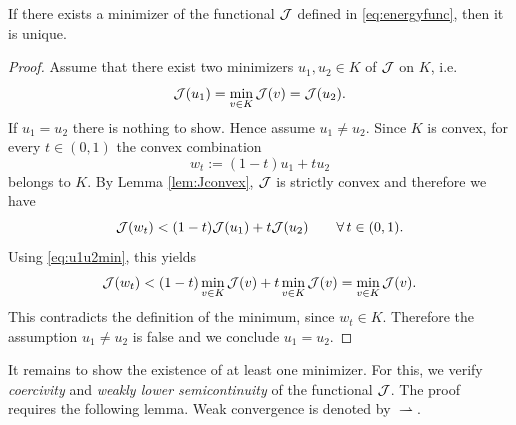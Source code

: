 \begin{proposition}\label{pr:Junique}
	If there exists a minimizer of the functional ${\mathcal J}$ defined in \eqref{eq:energyfunc}, then it is unique.
\end{proposition}
\begin{proof}
	Assume that there exist two minimizers $u_1,u_2\in K$ of ${\mathcal J}$ on $K$, i.e.
	\begin{equation}\label{eq:u1u2min}
		{\mathcal J}(u_1)=\min_{v\in K}{\mathcal J}(v)={\mathcal J}(u_2).
	\end{equation}
	If $u_1=u_2$ there is nothing to show. Hence assume $u_1\neq u_2$.
	Since $K$ is convex, for every $t\in(0,1)$ the convex combination
	\begin{equation*}
		w_t := (1-t)u_1+tu_2
	\end{equation*}
	belongs to $K$. By Lemma \ref{lem:Jconvex}, ${\mathcal J}$ is strictly convex and therefore we have
	\begin{equation*}
		{\mathcal J}(w_t) < (1-t){\mathcal J}(u_1)+t{\mathcal J}(u_2)\qquad \forall\, t\in(0,1).
	\end{equation*}
	Using \eqref{eq:u1u2min}, this yields
	\begin{equation*}
		{\mathcal J}(w_t) < (1-t)\min_{v\in K}{\mathcal J}(v)+t\min_{v\in K}{\mathcal J}(v)=\min_{v\in K}{\mathcal J}(v).
	\end{equation*}
	This contradicts the definition of the minimum, since $w_t\in K$.
	Therefore the assumption $u_1\neq u_2$ is false and we conclude $u_1=u_2$.
\end{proof}
It remains to show the existence of at least one minimizer. For this, we verify {\em coercivity} and {\em weakly lower semicontinuity} of the functional ${\mathcal J}$. The proof requires the following lemma. Weak convergence is denoted by $\rightharpoonup$.

